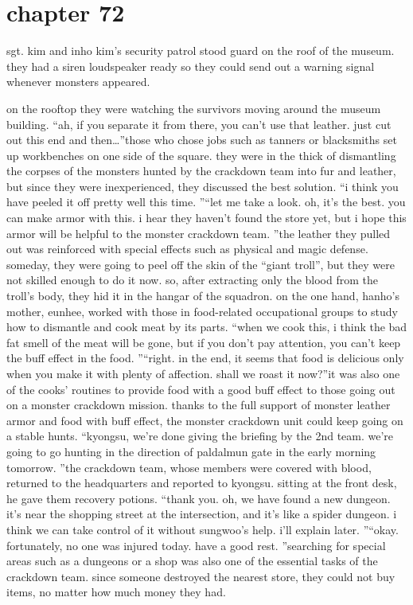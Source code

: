 \section{chapter 72}

                            sgt.
 kim and inho kim’s security patrol stood guard on the roof of the museum.
 they had a siren loudspeaker ready so they could send out a warning signal whenever monsters appeared.





on the rooftop they were watching the survivors moving around the museum building.
“ah, if you separate it from there, you can’t use that leather.
 just cut out this end and then…”those who chose jobs such as tanners or blacksmiths set up workbenches on one side of the square.
they were in the thick of dismantling the corpses of the monsters hunted by the crackdown team into fur and leather, but since they were inexperienced, they discussed the best solution.
“i think you have peeled it off pretty well this time.
”“let me take a look.
 oh, it’s the best.
 you can make armor with this.
 i hear they haven’t found the store yet, but i hope this armor will be helpful to the monster crackdown team.
”the leather they pulled out was reinforced with special effects such as physical and magic defense.
someday, they were going to peel off the skin of the “giant troll”, but they were not skilled enough to do it now.
 so, after extracting only the blood from the troll’s body, they hid it in the hangar of the squadron.
on the one hand, hanho’s mother, eunhee, worked with those in food-related occupational groups to study how to dismantle and cook meat by its parts.
“when we cook this, i think the bad fat smell of the meat will be gone, but if you don’t pay attention, you can’t keep the buff effect in the food.
”“right.
 in the end, it seems that food is delicious only when you make it with plenty of affection.
 shall we roast it now?”it was also one of the cooks’ routines to provide food with a good buff effect to those going out on a monster crackdown mission.
thanks to the full support of monster leather armor and food with buff effect, the monster crackdown unit could keep going on a stable hunts.
“kyongsu, we’re done giving the briefing by the 2nd team.
 we’re going to go hunting in the direction of paldalmun gate in the early morning tomorrow.
”the crackdown team, whose members were covered with blood, returned to the headquarters and reported to kyongsu.
 sitting at the front desk, he gave them recovery potions.
“thank you.
 oh, we have found a new dungeon.
 it’s near the shopping street at the intersection, and it’s like a spider dungeon.
 i think we can take control of it without sungwoo’s help.
 i’ll explain later.
”“okay.
 fortunately, no one was injured today.
 have a good rest.
”searching for special areas such as a dungeons or a shop was also one of the essential tasks of the crackdown team.
 since someone destroyed the nearest store, they could not buy items, no matter how much money they had.


